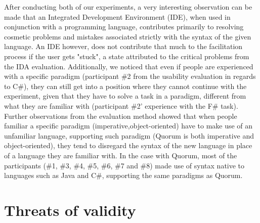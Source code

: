 After conducting both of our experiments, a very interesting observation can be made that an Integrated Development Environment (IDE), when used in conjunction with a programming language, contributes primarily to resolving cosmetic problems and mistakes associated strictly with the syntax of the given language. An IDE however, does not contribute that much to the facilitation process if the user gets "stuck", a state attributed to the critical problems from the IDA evaluation. Additionally, we noticed that even if people are experienced with a specific paradigm (participant \#2 from the usability evaluation in regards to C\#), they can still get into a position where they cannot continue with the experiment, given that they have to solve a task in a paradigm, different from what they are familiar with (participant \#2' experience with the F\# task). Further observations from the evaluation method showed that when people familiar a specific paradigm (imperative,object-oriented) have to make use of an unfamiliar language, supporting such paradigm (Quorum is both imperative and object-oriented), they tend to disregard the syntax of the new language in place of a language they are familiar with. In the case with Quorum, most of the participants (\#1, \#3, \#4, \#5, \#6, \#7 and \#8) made use of syntax native to languages such as Java and C\#, supporting the same paradigms as Quorum.
\section{Threats of validity}